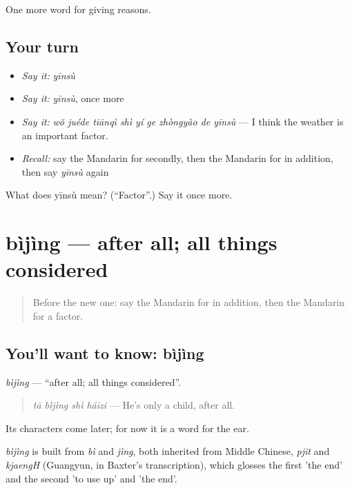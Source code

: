 \begin{grammarlens}[title={What you've built}]
One more word for giving reasons.
\end{grammarlens}

\subsection*{Your turn}
\begin{itemize}
\raggedright
  \item \emph{Say it:} \emph{yīnsù}
  \item \emph{Say it:} \emph{yīnsù}, once more
  \item \emph{Say it:} \emph{wǒ juéde tiānqì shì yí ge zhòngyào de yīnsù} — I think the weather is an important factor.
  \item \emph{Recall:} say the Mandarin for secondly, then the Mandarin for in addition, then say \emph{yīnsù} again
\end{itemize}

\begin{tcolorbox}[breakable,colback=teal!4,colframe=teal!35!black,title={Before you move on}]
What does yīnsù mean? (\textquotedblleft{}Factor\textquotedblright{}.) Say it once more.
\end{tcolorbox}
\section[bìjìng]{bìjìng — after all; all things considered}

\label{lesson:ZH-C370-bijing}



\begin{quote}
Before the new one: say the Mandarin for in addition, then the Mandarin for a factor.
\end{quote}

\subsection*{You'll want to know: bìjìng}
\emph{bìjìng} — \textquotedblleft{}after all; all things considered\textquotedblright{}.

\begin{quote}
\emph{tā bìjìng shì háizi} — He's only a child, after all.
\end{quote}

Its characters come later; for now it is a word for the ear.

\begin{cousinweb}
\emph{bìjìng} is built from \emph{bì} and \emph{jìng}, both inherited from Middle Chinese, \emph{pjit} and \emph{kjaengH} (Guangyun, in Baxter's transcription), which glosses the first 'the end' and the second 'to use up' and 'the end'.
\end{cousinweb}

